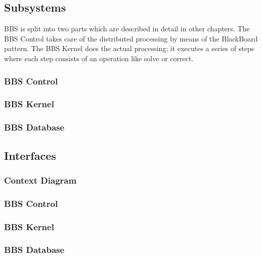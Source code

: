 \documentclass[10pt]{lofar}
\begin{document}
\subsection{Subsystems}
\label{subsec:subsystems}
BBS is split into two parts which are described in detail in other chapters. The
BBS Control takes care of the distributed processing by means of the BlackBoard
pattern. The BBS Kernel does the actual processing; it executes a series of
steps where each step consists of an operation like solve or correct.

\subsubsection{BBS Control}
\label{subsubsec:sys-control}

\subsubsection{BBS Kernel}
\label{subsubsec:sys-kernel}

\subsubsection{BBS Database}
\label{subsubsec:sys-database}

\subsection{Interfaces}
\label{subsec:sys-interfaces}

\subsubsection{Context Diagram}
\label{subsubsec:context}

\subsubsection{BBS Control}
\label{subsubsec:interf-control}

\subsubsection{BBS Kernel}
\label{subsubsec:interf-kernel}

\subsubsection{BBS Database}
\label{subsubsec:interf-database}
\end{document}
